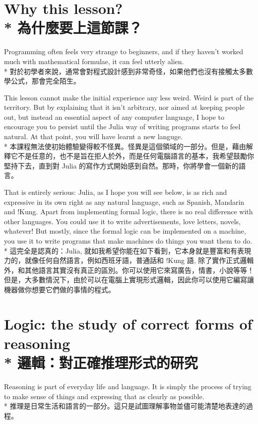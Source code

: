 \documentclass[]{article}
\begin{document}
\section*{{\color{gray}Why this lesson?}
\\*
{為什麼要上這節課？}}

{\color{gray}Programming often feels very strange to beginners, and if they haven't worked much with mathematical formulae, it can feel utterly alien.}
\\*
{對於初學者來說，通常會對程式設計感到非常奇怪，如果他們也沒有接觸太多數學公式，那會完全陌生。}

{\color{gray}This lesson cannot make the initial experience any less weird. Weird is part of the territory. But by explaining that it isn't arbitrary, nor aimed at keeping people out, but instead an essential aspect of any computer language, I hope to encourage you to persist until the Julia way of writing programs starts to feel natural. At that point, you will have learnt a new languge.}
\\*
{本課程無法使初始體驗變得較不怪異。怪異是這個領域的一部分。但是，藉由解釋它不是任意的，也不是旨在拒人於外，而是任何電腦語言的基本，我希望鼓勵你堅持下去，直到對 Julia 的寫作方式開始感到自然。那時，你將學會一個新的語言。}

{\color{gray}That is entirely serious: Julia, as I hope you will see below, is as rich and expressive in its own right as any natural language, such as Spanish, Mandarin and !Kung. Apart from implementing formal logic, there is no real difference with other languages. You could use it to write advertisements, love letters, novels, whatever! But mostly, since the formal logic can be implemented on a machine,  you use it to write programs that make machines do things you want them to do.}
\\*
{這完全是認真的：Julia, 就如我希望你能在如下看到，它本身就是豐富和有表現力的，就像任何自然語言，例如西班牙語，普通話和{ }!Kung 語, 除了實作正式邏輯外，和其他語言其實沒有真正的區別。你可以使用它來寫廣告，情書，小說等等！但是，大多數情況下，由於可以在電腦上實現形式邏輯，因此你可以使用它編寫讓機器做你想要它們做的事情的程式。}

\section*{{\color{gray}Logic: the study of correct forms of reasoning} 
\\*
{邏輯：對正確推理形式的研究}}		

{\color{gray}Reasoning is part of everyday life and language. It is simply the process of trying to make sense of things and expressing that as clearly as possible.}
\\*
{推理是日常生活和語言的一部分。這只是試圖理解事物並儘可能清楚地表達的過程。}
\end{document}
